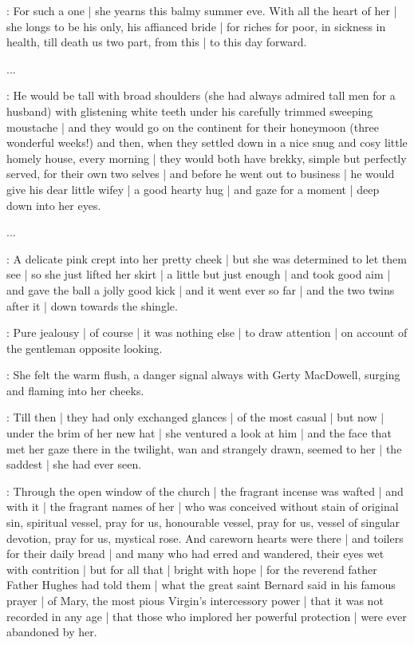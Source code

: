 \gertyRomantic:
For such a one |
she yearns this balmy summer eve.
With all the heart of her |
she longs to be his only,
his affianced bride |
for riches
for poor,
in sickness
in health,
till death us two part,
from this |
to this day forward.

...

\gertyNovel:
He would be tall with broad shoulders
(she had always admired tall men for a husband)
with glistening white teeth
under his carefully trimmed sweeping moustache |
and they would go on the continent
for their honeymoon
(three wonderful weeks!)
and then,
when they settled down in a nice snug and cosy little homely house,
every morning |
they would both have brekky,%
simple but perfectly served,
for their own two selves |
and before he went out to business |
he would give his dear little wifey |
a good hearty hug |
and gaze for a moment |
deep down into her eyes.

...

\gertyReal:
A delicate pink
crept into her pretty cheek |
but she was determined to let them see |
so she just lifted her skirt |
a little but just enough |
and took good aim |
and gave the ball a jolly good kick |
and it went ever so far |
and the two twins after it |
down towards the shingle.

\gertyJudgy:
Pure jealousy |
of course |
it was nothing else |
to draw attention |
on account of the gentleman opposite looking.

\gertySex:
She felt the warm flush,
a danger signal always with Gerty MacDowell,
surging and flaming into her cheeks.

\gertyRomantic:
Till then |
they had only exchanged glances |
of the most casual |
but now |
under the brim of her new hat |
she ventured a look at him |
and the face that met her gaze there in the twilight,
wan and strangely drawn,
seemed to her |%
the saddest |
she had ever seen.

\Nrelig:
Through the open window of the church |
the fragrant incense was wafted |
and with it |
the fragrant names of her |
who was conceived without stain of original sin,
spiritual vessel,
pray for us,
honourable vessel,
pray for us,
vessel of singular devotion,
pray for us,
mystical rose.
And careworn hearts were there |
and toilers for their daily bread |
and many who had erred and wandered,
their eyes wet with contrition |
but for all that |
bright with hope |
for the reverend father Father Hughes
had told them |
what the great saint Bernard said in his famous prayer |
of Mary,
the most pious Virgin's intercessory power |
that it was not recorded in any age |
that those who implored her powerful protection |%
were ever abandoned by her.

